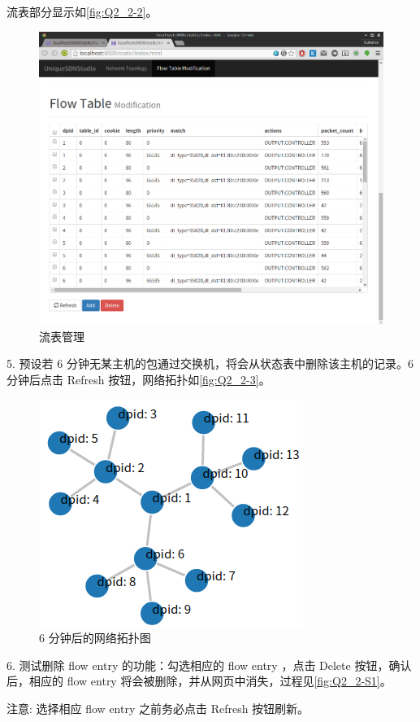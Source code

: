 \documentclass[format=draft,language=chinese,category=SDN]{hustreport}
\begin{document}
流表部分显示如\autoref{fig:Q2_2-2}。

\begin{figure}[!h]
\centering
\includegraphics[width=.7\textwidth]{fig/2_2-2.png}
\caption{流表管理}\label{fig:Q2_2-2}
\end{figure}

5. 预设若 6 分钟无某主机的包通过交换机，将会从状态表中删除该主机的记录。6 分钟后点击 Refresh 按钮，网络拓扑如\autoref{fig:Q2_2-3}。

\begin{figure}[!h]
\centering
\includegraphics[width=.4\textwidth]{fig/2_2-3.png}
\caption{6 分钟后的网络拓扑图}\label{fig:Q2_2-3}
\end{figure}

6. 测试删除 flow entry 的功能：勾选相应的 flow entry ，点击 Delete 按钮，确认后，相应的 flow entry 将会被删除，并从网页中消失，过程见\autoref{fig:Q2_2-S1}。

注意: 选择相应 flow entry 之前务必点击 Refresh 按钮刷新。
\end{document}
